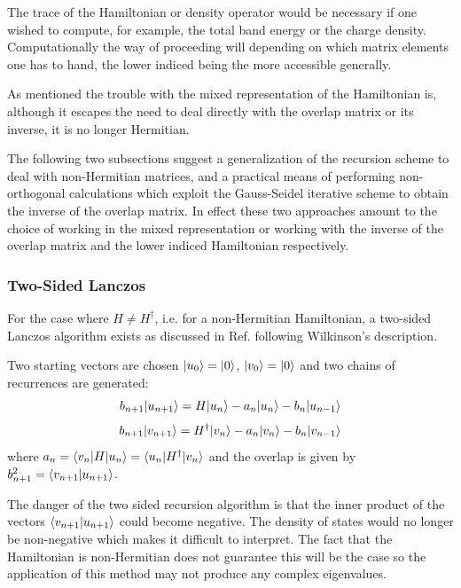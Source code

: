 The trace of the Hamiltonian or density operator would be necessary 
if one wished to compute, for example, the total band energy 
or the charge density. Computationally the way of proceeding will
depending on which matrix elements one has to hand, 
the lower indiced being the more accessible generally. 

As mentioned the trouble with the mixed representation of the Hamiltonian is,
although it escapes the need to deal directly with the overlap 
matrix or its inverse, it is no longer Hermitian. 

The following two subsections suggest a generalization of the recursion
scheme to deal with non-Hermitian matrices, and a practical means
of performing non-orthogonal calculations which exploit the Gauss-Seidel
iterative scheme to obtain the inverse of the overlap matrix.
In effect these two approaches amount to the choice of working
in the mixed representation or working with the inverse of the overlap
matrix and the lower indiced Hamiltonian respectively.

\subsubsection{Two-Sided Lanczos}
For the case where $H\neq H^{\dagger}$, i.e. for a non-Hermitian
Hamiltonian, a two-sided Lanczos algorithm exists as discussed in
Ref.\cite{haydockkelly75} following Wilkinson's description.

Two starting vectors are chosen $|u_{0}\rangle=|0\rangle$, $|v_{0}\rangle=|0\rangle$
and two chains of recurrences are generated:
%
\begin{equation}
b_{n+1}|u_{n+1}\rangle = H|u_{n}\rangle - a_{n}|u_{n}\rangle - b_{n}|u_{n-1}\rangle
\end{equation}
%
\begin{equation}
b_{n+1}|v_{n+1}\rangle = H^{\dagger}|v_{n}\rangle - a_{n}|v_{n}\rangle - b_{n}|v_{n-1}\rangle
\end{equation}
%
where $a_{n} = \langle v_{n}|H|u_{n}\rangle = \langle u_{n}|H^{\dagger}|v_{n}\rangle$
and the overlap is given by $b^{2}_{n+1} = \langle v_{n+1}|u_{n+1}\rangle$.

The danger of the two sided recursion algorithm is that the inner
product of the vectors $\langle v_{n+1}|u_{n+1}\rangle$ could become negative.
The density of states would no longer be non-negative which makes it
difficult to interpret. The fact that the Hamiltonian is non-Hermitian 
does not guarantee this will 
be the case so the application of this method may not produce 
any complex eigenvalues. 

